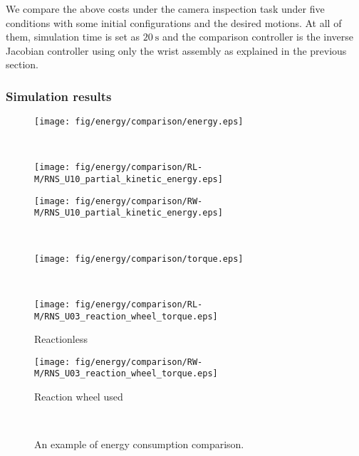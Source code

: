 \documentclass[preprint,12pt]{elsarticle}
\def\unit#1{{~\mathrm{#1}}}
\begin{document}
We compare the above costs under the camera inspection task under five conditions
with some initial configurations and the desired motions.
At all of them, simulation time is set as $20\unit{s}$ and the comparison controller is
the inverse Jacobian controller using only the wrist assembly as explained in the previous section.


\subsubsection{Simulation results}
%
\begin{figure}[t]
  \centering
  \begin{minipage}[h]{0.5\linewidth}
    \centering
    \texttt{[image: fig/energy/comparison/energy.eps]}
  \end{minipage}\\
  \vspace{-4mm}
  \begin{minipage}[h]{0.40\linewidth}
    \centering
    \texttt{[image: fig/energy/comparison/RL-M/RNS\_U10\_partial\_kinetic\_energy.eps]}
  \end{minipage}
  \hspace{-4mm}
  \begin{minipage}[h]{0.40\linewidth}
    \centering
    \texttt{[image: fig/energy/comparison/RW-M/RNS\_U10\_partial\_kinetic\_energy.eps]}
  \end{minipage}\\
  \vspace{-7mm}
  \centering
  \begin{minipage}[h]{0.350\linewidth}
    \centering
    \texttt{[image: fig/energy/comparison/torque.eps]}
  \end{minipage}\\
  \vspace{-4mm}
  \begin{minipage}[h]{0.40\linewidth}
    \centering
    \texttt{[image: fig/energy/comparison/RL-M/RNS\_U03\_reaction\_wheel\_torque.eps]}
    \footnotesize\par{\vspace{-2mm}\hspace{8mm}Reactionless}
  \end{minipage}
  \hspace{-4mm}
  \begin{minipage}[h]{0.40\linewidth}
    \centering
    \texttt{[image: fig/energy/comparison/RW-M/RNS\_U03\_reaction\_wheel\_torque.eps]}
    \footnotesize\par{\vspace{-2mm}\hspace{8mm}Reaction wheel used}
  \end{minipage}\\
  \vspace{-4mm}
  \vspace{1em}
  \caption{An example of energy consumption comparison.}
  \label{fig:RES_ENE}
\end{figure}
\end{document}
